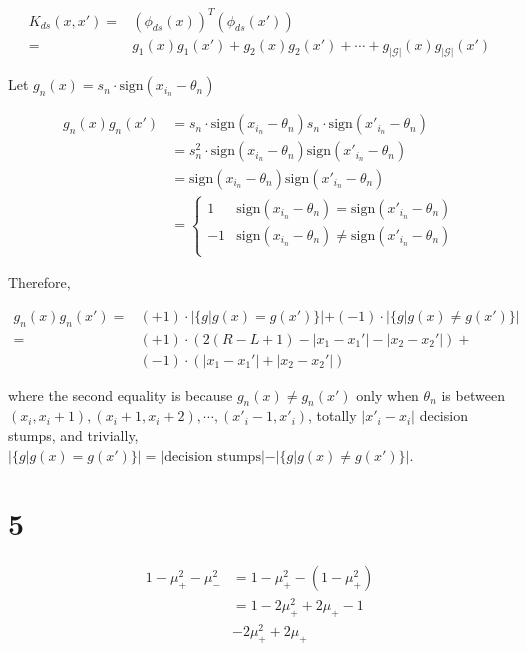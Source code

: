 \documentclass[fleqn,a4paper,12pt]{article}
\begin{document}
\begin{align*}
  K_{ds}(x, x')
  =& (\phi_{ds}(x))^T(\phi_{ds}(x')) \\
  =& g_1(x)g_1(x') + g_2(x)g_2(x') + \cdots + g_{|\mathcal{G}|}(x)g_{|\mathcal{G}|}(x')
\end{align*}

Let $g_n(x) = s_n \cdot \mathrm{sign}(x_{i_n} - \theta_n)$

\begin{align*}
  g_n(x)g_n(x')
  &= s_n \cdot \mathrm{sign}(x_{i_n} - \theta_n) s_n \cdot \mathrm{sign}(x'_{i_n} - \theta_n) \\
  &= s_n^2 \cdot \mathrm{sign}(x_{i_n} - \theta_n) \mathrm{sign}(x'_{i_n} - \theta_n) \\  
  &= \mathrm{sign}(x_{i_n} - \theta_n) \mathrm{sign}(x'_{i_n} - \theta_n) \\
  &=\begin{cases}
    1 & \mathrm{sign}(x_{i_n} - \theta_n) = \mathrm{sign}(x'_{i_n} - \theta_n) \\
    -1 & \mathrm{sign}(x_{i_n} - \theta_n) \ne \mathrm{sign}(x'_{i_n} - \theta_n) \\
  \end{cases}
\end{align*}

Therefore, 

\begin{align*}
  g_n(x)g_n(x')
  =& (+1) \cdot |\{g | g(x) = g(x')\}| + (-1) \cdot |\{g | g(x) \ne g(x')\}| \\
  =& (+1) \cdot (2(R - L + 1) - |x_1 - x_1'| - |x_2 - x_2'|) + \\
    & (-1) \cdot (|x_1 - x_1'| + |x_2 - x_2'|)
\end{align*}

where the second equality is because $g_n(x) \ne g_n(x')$ only when $\theta_n$ is between $(x_i, x_i + 1), (x_i + 1, x_i + 2), \cdots, (x'_i - 1, x'_i)$, totally $|x'_i - x_i|$ decision stumps, and trivially, $|\{g | g(x) = g(x')\}| = |\text{decision stumps}| - |\{g | g(x) \ne g(x')\}|$.

\section*{5}

\begin{align*}
  1 - \mu_+^2 - \mu_-^2
  &= 1 - \mu_+^2 - (1 - \mu_+^2) \\
  &= 1 - 2 \mu_+^2 + 2 \mu_+  - 1 \\
  & -2 \mu_+^2 + 2 \mu_+
\end{align*}
\end{document}
